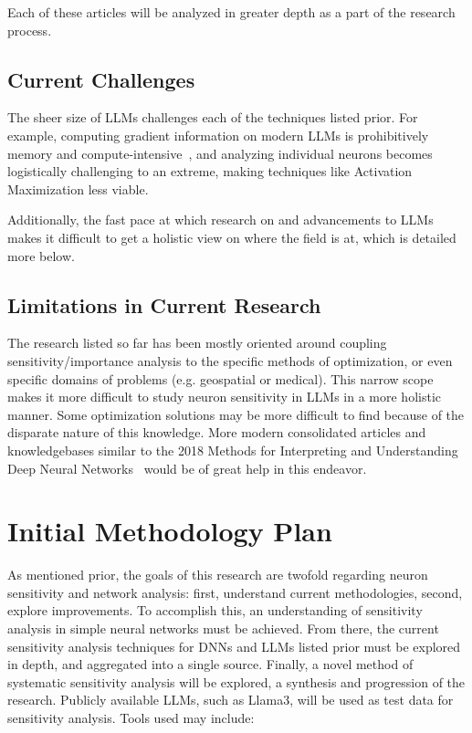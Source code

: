 \documentclass{article}
\begin{document}
Each of these articles will be analyzed in greater depth as a part of the research process.

\subsection*{Current Challenges}

The sheer size of LLMs challenges each of the techniques listed prior.
For example, computing gradient information on modern LLMs is prohibitively memory and compute-intensive~\cite{muralidharan2024compact}, and analyzing individual neurons becomes logistically challenging to an extreme, making techniques like Activation Maximization less viable.

Additionally, the fast pace at which research on and advancements to LLMs makes it difficult to get a holistic view on where the field is at, which is detailed more below.

\subsection*{Limitations in Current Research}
The research listed so far has been mostly oriented around coupling sensitivity/importance analysis to the specific methods of optimization, or even specific domains of problems (e.g. geospatial or medical).
This narrow scope makes it more difficult to study neuron sensitivity in LLMs in a more holistic manner.
Some optimization solutions may be more difficult to find because of the disparate nature of this knowledge.
More modern consolidated articles and knowledgebases similar to the 2018 Methods for Interpreting and Understanding Deep Neural Networks~\cite{montavon2018methods} would be of great help in this endeavor.

\section*{Initial Methodology Plan}
As mentioned prior, the goals of this research are twofold regarding neuron sensitivity and network analysis: first, understand current methodologies, second, explore improvements.
To accomplish this, an understanding of sensitivity analysis in simple neural networks must be achieved.
From there, the current sensitivity analysis techniques for DNNs and LLMs listed prior must be explored in depth, and aggregated into a single source.
Finally, a novel method of systematic sensitivity analysis will be explored, a synthesis and progression of the research.
Publicly available LLMs, such as Llama3, will be used as test data for sensitivity analysis.
\newline
\newline
Tools used may include:
\end{document}

